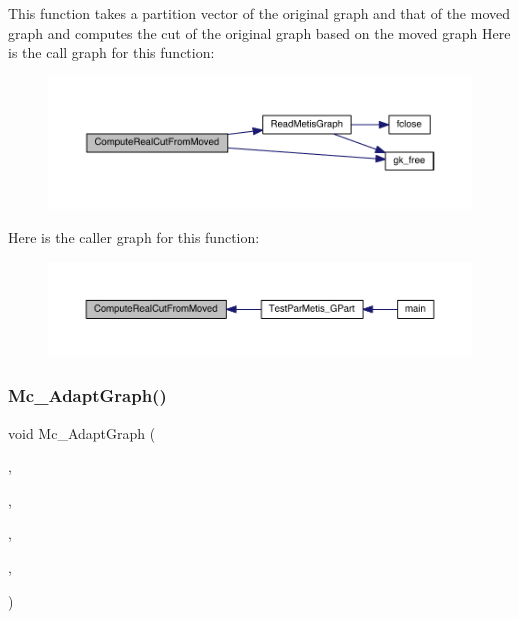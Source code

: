 This function takes a partition vector of the original graph and that of the moved graph and computes the cut of the original graph based on the moved graph Here is the call graph for this function\+:\nopagebreak
\begin{figure}[H]
\begin{center}
\leavevmode
\includegraphics[width=350pt]{a00954_a5e1fe783f0bb3f52b2996b256900bfff_cgraph}
\end{center}
\end{figure}
Here is the caller graph for this function\+:\nopagebreak
\begin{figure}[H]
\begin{center}
\leavevmode
\includegraphics[width=350pt]{a00954_a5e1fe783f0bb3f52b2996b256900bfff_icgraph}
\end{center}
\end{figure}
\mbox{\label{a00954_a6f07f5a19ed9d8794b6061542aa6015b}} 
\subsubsection{\texorpdfstring{Mc\+\_\+\+Adapt\+Graph()}{Mc\_AdaptGraph()}}
{\footnotesize\ttfamily void Mc\+\_\+\+Adapt\+Graph (\begin{DoxyParamCaption}\item[{\hyperlink{a00734}{graph\+\_\+t} $\ast$}]{,  }\item[{\hyperlink{a00876_aaa5262be3e700770163401acb0150f52}{idx\+\_\+t} $\ast$}]{,  }\item[{\hyperlink{a00876_aaa5262be3e700770163401acb0150f52}{idx\+\_\+t}}]{,  }\item[{\hyperlink{a00876_aaa5262be3e700770163401acb0150f52}{idx\+\_\+t}}]{,  }\item[{M\+P\+I\+\_\+\+Comm}]{ }\end{DoxyParamCaption})}

